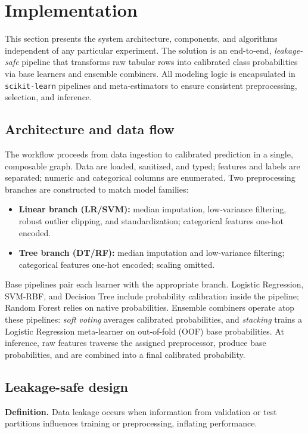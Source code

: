 \documentclass[conference]{IEEEtran}
\begin{document}
\section{\textbf{Implementation}}
\label{sec:implementation}

This section presents the system architecture, components, and algorithms independent of any particular experiment. The solution is an end-to-end, \emph{leakage-safe} pipeline that transforms raw tabular rows into calibrated class probabilities via base learners and ensemble combiners. All modeling logic is encapsulated in \texttt{scikit-learn} pipelines and meta-estimators to ensure consistent preprocessing, selection, and inference.

\subsection{Architecture and data flow}
The workflow proceeds from data ingestion to calibrated prediction in a single, composable graph. Data are loaded, sanitized, and typed; features and labels are separated; numeric and categorical columns are enumerated. Two preprocessing branches are constructed to match model families:
\begin{itemize}
  \item \textbf{Linear branch (LR/SVM):} median imputation, low-variance filtering, robust outlier clipping, and standardization; categorical features one-hot encoded.
  \item \textbf{Tree branch (DT/RF):} median imputation and low-variance filtering; categorical features one-hot encoded; scaling omitted.
\end{itemize}
Base pipelines pair each learner with the appropriate branch. Logistic Regression, SVM-RBF, and Decision Tree include probability calibration inside the pipeline; Random Forest relies on native probabilities. Ensemble combiners operate atop these pipelines: \emph{soft voting} averages calibrated probabilities, and \emph{stacking} trains a Logistic Regression meta-learner on out-of-fold (OOF) base probabilities. At inference, raw features traverse the assigned preprocessor, produce base probabilities, and are combined into a final calibrated probability.

\subsection{Leakage-safe design}
\textbf{Definition.} Data leakage occurs when information from validation or test partitions influences training or preprocessing, inflating performance. 
\end{document}
